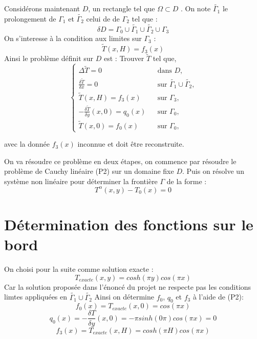 \documentclass{article}
\begin{document}
Considérons maintenant $D$, un rectangle tel que $\Omega \subset D$ . On note $\tilde{\Gamma_1}$ le prolongement de $\Gamma_1$ et $\tilde{\Gamma_2}$ celui de de $\Gamma_2$ tel que :
\begin{equation}
    \delta D = \Gamma_0 \cup \tilde{\Gamma_1} \cup \tilde{\Gamma_2} \cup \Gamma_3
\end{equation}
On s'interesse à la condition aux limites sur $\Gamma_3$ :
\begin{equation}
    \tilde{T}(x, H) = f_3(x) 
\end{equation}
Ainsi le problème définit sur $D$ est :
            Trouver $\tilde{T}$ tel que,
\begin{equation}
  \label{eq/P2}
  \left\{
    \begin{array}{rcl}
      \Delta \tilde{T} = 0 && \textrm{dans $D$,}\\
      \frac{\delta \tilde{T}}{\delta x} = 0 && \textrm{sur $\tilde{\Gamma_1} \cup \tilde{\Gamma_2}$,}\\
      \tilde{T}(x, H) = f_3(x) && \textrm{sur $\Gamma_3$,}\\
      -\frac{\delta \tilde{T}}{\delta y}(x, 0) = q_0(x) && \textrm{sur $\Gamma_0$,}\\
      \tilde{T}(x, 0) = f_0(x) && \textrm{sur $\Gamma_0$,}
    \end{array}
  \right.
  \tag{P2}
\end{equation}



avec la donnée $f_3(x)$ inconnue et doit être reconstruite.

On va résoudre ce problème en deux étapes, on commence par résoudre le problème de Cauchy linéaire (P2) sur un domaine fixe $D$. Puis on résolve un système non linéaire pour déterminer la frontière $\Gamma$ de la forme :
\begin{equation}
    T^\alpha(x,y) - T_0(x) = 0
\end{equation}


\section{Détermination des fonctions sur le bord}
On choisi pour la suite comme solution exacte :
\begin{equation}
    T_{exacte}(x, y) = cosh(\pi y)cos(\pi x)
\end{equation}
Car la solution proposée dans l'énoncé du projet ne respecte pas les conditions limtes appliquées en $\tilde{\Gamma_1} \cup \tilde{\Gamma_2}$
Ainsi on détermine $f_0$, $q_0$ et $f_3$ à l'aide de (P2):
\begin{equation}
    f_0(x) = T_{exacte}(x, 0) = cos(\pi x)
\end{equation}
\begin{equation}
    q_0(x) = -\frac{\delta T}{\delta y}(x, 0) = -\pi sinh(0\pi)cos(\pi x) = 0
\end{equation}
\begin{equation}
    f_3(x) = T_{exacte}(x, H) = cosh(\pi H)cos(\pi x)
\end{equation}
\end{document}
